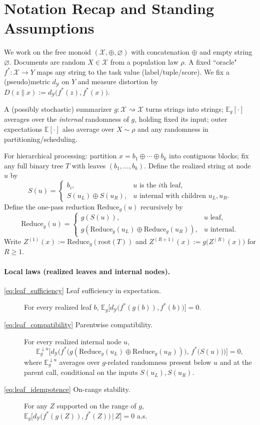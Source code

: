 \documentclass[11pt]{article}
\newcommand{\Strings}{\mathcal{X}}       %
\newcommand{\Y}{\mathcal{Y}}               %
\newcommand{\fstar}{f^*}               %
\newcommand{\E}{\mathbb{E}}
\newcommand{\concat}{\oplus}                    %
\newcommand{\metric}{d_{\Y}}
\newcommand{\reduce}{\text{Reduce}}
\newcommand{\reduceg}{\reduce_g}
\newcommand{\Eg}{\E_g}     %
\begin{document}




\appendix

\section{Notation Recap and Standing Assumptions}
\label{app:notation}

We work on the free monoid $(\Strings,\concat ,\varnothing)$ with concatenation $\concat $ and empty string $\varnothing$.
Documents are random $X\in \Strings$ from a population law $\rho$. A fixed ``oracle" $\fstar:\Strings\to Y$ maps any string to the task value (label/tuple/score). We fix a (pseudo)metric $\metric$ on $Y$ and measure distortion by $D(z\|x):=\metric\big(\fstar(z),\fstar(x)\big)$.

A (possibly stochastic) summarizer $g:\Strings\rightsquigarrow \Strings$ turns strings into strings; $\Eg[\cdot]$ averages over the \emph{internal} randomness of $g$, holding fixed its input; outer expectations $\E[\cdot]$ also average over $X\sim\rho$ and any randomness in partitioning/scheduling.

For hierarchical processing: partition $x=b_1\concat \cdots\concat b_k$ into contiguous blocks; fix any full binary tree $T$ with leaves $(b_1,\dots,b_k)$. Define the realized string at node $u$ by
\[
S(u)=
\begin{cases}
b_i,&u\text{ is the $i$th leaf},\\
S(u_L)\concat S(u_R),&u\text{ internal with children }u_L,u_R.
\end{cases}
\]
Define the one-pass reduction $\reduceg(u)$ recursively by
\[
\reduceg(u)=
\begin{cases}
g\!\left(S(u)\right),&u\text{ leaf},\\
g\!\left(\reduceg(u_L)\concat \reduceg(u_R)\right),&u\text{ internal}.
\end{cases}
\]
Write $Z^{(1)}(x):=\reduceg(\mathrm{root}(T))$ and $Z^{(R+ 1)}(x):=g\!\big(Z^{(R)}(x)\big)$ for $R\ge 1$.

\paragraph{Local laws (realized leaves and internal nodes).}
\begin{description}
  \item[\ref{eq:leaf_sufficiency} Leaf sufficiency in expectation.] For every realized leaf $b$, $\Eg\big[\metric\!\big(\fstar(g(b)), \fstar(b)\big)\big]=0$.
  \item[\ref{eq:leaf_compatibility} Parentwise compatibility.] For every realized internal node $u$,
  \[
  \E^{\downarrow u}_g\!\Big[\metric\!\Big(\fstar\!\big(g(\reduceg(u_L)\concat \reduceg(u_R))\big),\,\fstar\!\big(S(u)\big)\Big)\Big]=0,
  \]
  where $\E^{\downarrow u}_g$ averages over $g$-related randomness present below $u$ and at the parent call, conditional on the inputs $S(u_L),S(u_R)$.
  \item[\ref{eq:leaf_idempotence} On-range stability.] For any $Z$ supported on the range of $g$,
  $\Eg\!\big[\metric\!\big(\fstar(g(Z)),\fstar(Z)\big)\,\big|\,Z\big]=0$ a.s.
\end{description}
\end{document}
